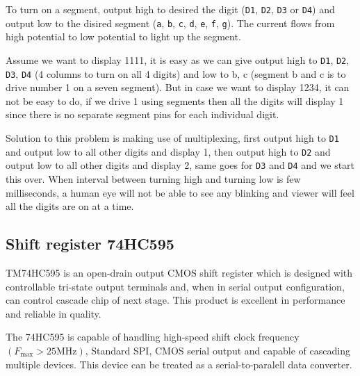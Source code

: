 \documentclass[13pt,a4paper,twoside]{report}
\begin{document}

To turn on a segment, output high to desired the digit (\texttt{D1}, \texttt{D2}, \texttt{D3} or \texttt{D4}) and output low to the disired segment (\texttt{a}, \texttt{b}, \texttt{c}, \texttt{d}, \texttt{e}, \texttt{f}, \texttt{g}). The current flows from high potential to low potential to light up the segment.

Assume we want to display 1111, it is easy as we can give output high to \texttt{D1}, \texttt{D2}, \texttt{D3}, \texttt{D4} (4 columns to turn on all 4  digits) and low to b, c (segment b and c is to drive number 1 on a seven segment). But in case we want to display 1234, it can not be easy to do, if we drive 1 using segments then all the digits will display 1 since there is no separate segment pins for each individual digit.

Solution to this problem is making use of multiplexing, first output high to \texttt{D1} and output low to all other digits and display 1, then output high to \texttt{D2} and output low to all other digits and display 2, same goes for \texttt{D3} and \texttt{D4} and we start this over. When interval between turning high and turning low is few milliseconds, a human eye will not be able to see any blinking and viewer will feel all the digits are on at a time.

\subsection{Shift register 74HC595}
TM74HC595 is an open-drain output CMOS shift register which is designed with controllable tri-state output terminals and, when in serial output configuration, can control cascade chip of next stage. This product is excellent in performance and reliable in quality.

The 74HC595 is capable of handling high-speed shift clock frequency $(F_{\text{max}} > 25 \text{MHz})$, Standard SPI, CMOS serial output and capable of cascading multiple devices. This device can be treated as a serial-to-paralell data converter.
\end{document}

